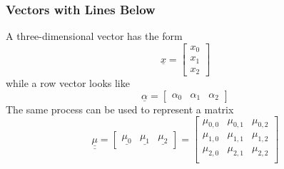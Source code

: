 \subsubsection{Vectors with Lines Below}
    A three-dimensional vector has the form
    \begin{equation}
        \underline{x}
            =\begin{bmatrix}
                x_0 \\ x_1 \\ x_2
             \end{bmatrix}
    \end{equation}
    while a row vector looks like
    \begin{equation}
        \underline{\alpha}
            =\begin{bmatrix}
                \alpha_0 & \alpha_1 & \alpha_2
             \end{bmatrix}
    \end{equation}
    The same process can be used to represent a matrix
    \begin{equation}
        \underline{\underline{\mu}}
            =\begin{bmatrix}
                \underline{\mu_0} & \underline{\mu_1} & \underline{\mu_2}
             \end{bmatrix}
            =\begin{bmatrix}
                \mu_{0,0} & \mu_{0,1} & \mu_{0,2} \\
                \mu_{1,0} & \mu_{1,1} & \mu_{1,2} \\
                \mu_{2,0} & \mu_{2,1} & \mu_{2,2} \\
             \end{bmatrix}
    \end{equation}
